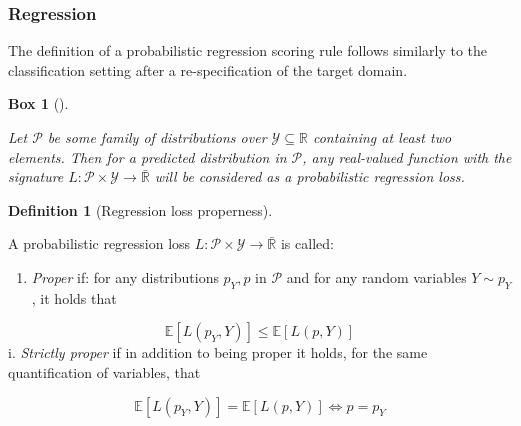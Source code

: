 \documentclass[
  letterpaper,
]{scrbook}
\providecommand{\tightlist}{%
  \setlength{\itemsep}{0pt}\setlength{\parskip}{0pt}}\usepackage{longtable,booktabs,array}
\theoremstyle{plain}
\newtheorem{conjecture}{Box}[chapter]
\theoremstyle{definition}
\newtheorem{definition}{Definition}[chapter]
\theoremstyle{remark}
\begin{document}
\hypertarget{sec-eval-distr-score-reg-reg}{%
\subsubsection{Regression}\label{sec-eval-distr-score-reg-reg}}

The definition of a probabilistic regression scoring rule follows
similarly to the classification setting after a re-specification of the
target domain.

\begin{tcolorbox}[enhanced jigsaw, titlerule=0mm, bottomrule=.15mm, left=2mm, leftrule=.75mm, rightrule=.15mm, colbacktitle=quarto-callout-note-color!10!white, bottomtitle=1mm, opacitybacktitle=0.6, title={Probabilistic regression loss}, breakable, arc=.35mm, coltitle=black, toprule=.15mm, colframe=quarto-callout-note-color-frame, opacityback=0, toptitle=1mm, colback=white]

\leavevmode{}%
\begin{conjecture}[]\label{cnj-loss-regr}

Let \(\mathcal{P}\) be some family of distributions over
\(\mathcal{Y}\subseteq \mathbb{R}\) containing at least two elements.
Then for a predicted distribution in \(\mathcal{P}\), any real-valued
function with the signature
\(L: \mathcal{P}\times \mathcal{Y}\rightarrow \bar{\mathbb{R}}\) will be
considered as a \emph{probabilistic regression loss}.

\end{conjecture}

\end{tcolorbox}

\leavevmode{}%
\begin{definition}[Regression loss properness]\label{def-regr-proper}

A probabilistic regression loss
\(L: \mathcal{P}\times \mathcal{Y}\rightarrow \bar{\mathbb{R}}\) is
called:

\begin{enumerate}
\def\labelenumi{\roman{enumi}.}
\tightlist
\item
  \emph{Proper} if: for any distributions \(p_Y,p\) in \(\mathcal{P}\)
  and for any random variables \(Y \sim p_Y\), it holds that
\end{enumerate}

\[
\mathbb{E}[L(p_Y, Y)] \leq \mathbb{E}[L(p, Y)]
\] i. \emph{Strictly proper} if in addition to being proper it holds,
for the same quantification of variables, that

\[
\mathbb{E}[L(p_Y, Y)] = \mathbb{E}[L(p, Y)] \Leftrightarrow p = p_Y
\]

\end{definition}
\end{document}
